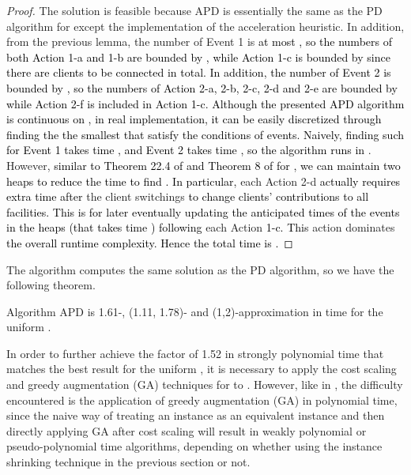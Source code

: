 \documentclass[10pt]{llncs}
\begin{document}
\begin{proof}
The solution is feasible because APD is essentially the same as the
PD algorithm for  except the implementation of the acceleration
heuristic. In addition,\textcolor{black}{{} }from the previous lemma,
the number of Event 1 is \textcolor{black}{at most ,
so the numbers of both Action 1-a and 1-b are bounded by ,
while Action 1-c is bounded by  since there are  clients
to be connected in total. In addition, the number of Event 2 is bounded
by , so the numbers of Action
2-a, 2-b, 2-c, 2-d and 2-e are bounded by 
while Action 2-f is included in Action 1-c. Although the presented
APD algorithm is continuous on , in real implementation, it can
be easily discretized through finding the the smallest  that satisfy
the conditions of events. Naively, finding such  for Event 1 takes
time , and Event 2 takes time ,
so the algorithm runs in }. However, \textcolor{black}{similar
to Theorem 22.4 of \cite{JensVygenFL06Book} and Theorem 8 of \cite{jain01approximation}
for , we can maintain two heaps to reduce the time to find .
In particular,} each Action 2-d \textcolor{black}{actually requires
extra time  after }the client switchings\textcolor{black}{{}
to change clients' contributions to all facilities. This is for later
eventually updating the anticipated times of the events in the heaps
(that takes time ) following
}each Action \textcolor{black}{1-c. This} action dominates\textcolor{black}{{}
the overall runtime complexity. Hence the total time is .}
\end{proof}
The algorithm computes the same solution as the PD algorithm, so we
have the following theorem.
\begin{theorem}
Algorithm APD is 1.61-, (1.11, 1.78)- and (1,2)-approximation in time
 for the uniform .
\end{theorem}
In order to further achieve the factor of 1.52 in strongly polynomial
time that matches the best result \cite{Swamy08FTFL2.076} for the
uniform , it is necessary to apply the cost scaling and greedy
augmentation (GA) techniques \cite{Swamy08FTFL2.076,Guha03FTFL2.41}
for  to . However, like in \cite{kewen2011cocoon,yan2011approximation},
the difficulty encountered is the application of greedy augmentation
(GA) in polynomial time, since the naive way of treating an 
instance as an equivalent  instance and then directly applying
GA after cost scaling will result in weakly polynomial or pseudo-polynomial
time algorithms, depending on whether using the instance shrinking
technique in the previous section or not. 
\end{document}
